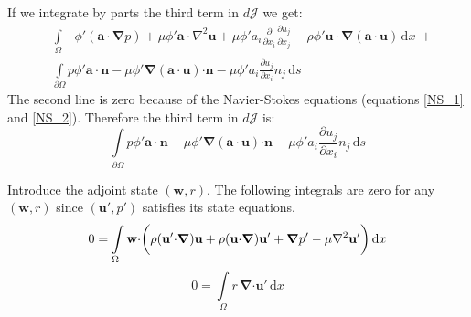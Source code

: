 \documentclass[12pt, a4paper]{article}
\begin{document}
    If we integrate by parts the third term in $d \mathcal{J}$ we get:
    \begin{equation}
    \begin{split}
        &\int\limits_{\Omega}{- \phi' (\mathbf{a \cdot} \boldsymbol{\nabla} p)} + 
            {\mu \phi' \mathbf{a \cdot} \nabla^2 \mathbf{u}} + 
            {\mu \phi' a_i \frac{\partial}{\partial x_i} \frac{\partial u_j}{\partial x_j}} - 
            {\rho \phi' \mathbf{u \cdot} \boldsymbol{\nabla}(\mathbf{a \cdot u})}
        \, \mathrm{d}x \ + \\
        &\int\limits_{\partial \Omega}{p \phi' \mathbf{a \cdot n}} - 
            {\mu \phi' \boldsymbol{\nabla}(\mathbf{a \cdot u}) \mathbf{\cdot n}} - 
            {\mu \phi' a_i \frac{\partial u_j}{\partial x_i} n_j}
        \, \mathrm{d}s
    \end{split}
    \end{equation}
    The second line is zero because of the Navier-Stokes equations (equations \ref{NS_1} and \ref{NS_2}). Therefore the third term in $d \mathcal{J}$ is:
    \begin{equation} \label{cost_change_term_3}
        \int\limits_{\partial \Omega}{p \phi' \mathbf{a \cdot n}} - 
            {\mu \phi' \boldsymbol{\nabla}(\mathbf{a \cdot u}) \mathbf{\cdot n}} - 
            {\mu \phi' a_i \frac{\partial u_j}{\partial x_i} n_j}
        \, \mathrm{d}s
    \end{equation}
    
    Introduce the adjoint state $(\mathbf{w}, r)$. The following integrals are zero for any $(\mathbf{w}, r)$ since $(\mathbf{u'}, p')$ satisfies its state equations.
    \begin{equation} \label{adj_velocity_original}
        0 = \int\limits_{\Omega}\mathbf{w \cdot} \bigg{(}
            {\rho (\mathbf{u' \cdot} \boldsymbol{\nabla}) \mathbf{u}} + 
            {\rho (\mathbf{u \cdot} \boldsymbol{\nabla}) \mathbf{u'}} + 
            {\boldsymbol{\nabla} p'} - 
            {\mu \nabla^2 \mathbf{u'}}
        \bigg{)} \, \mathrm{d}x
    \end{equation}
    \begin{equation} \label{adj_pressure_original}
        0 = \int\limits_{\Omega}{r \, \boldsymbol{\nabla} \mathbf{\cdot u'}} \, \mathrm{d}x
    \end{equation}
    
\end{document}
